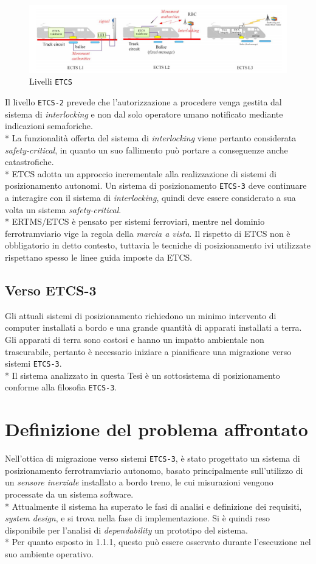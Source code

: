 \begin{figure}[h]
	\centering
	\includegraphics[width=\linewidth]{img/etcs123.png}
	\caption{Livelli \texttt{ETCS}}
	\label{fig:etcs123}
\end{figure}
Il livello \texttt{ETCS-2} prevede che l'autorizzazione a procedere venga gestita dal sistema di \emph{interlocking} e non dal solo operatore umano notificato mediante indicazioni semaforiche.\\*
La funzionalit\`a offerta del sistema di \emph{interlocking} viene pertanto considerata \emph{safety-critical}, in quanto un suo fallimento pu\`o portare a conseguenze anche catastrofiche.\cite{marocchini}\\*
ETCS adotta un approccio incrementale alla realizzazione di sistemi di posizionamento autonomi. Un sistema di posizionamento \texttt{ETCS-3} deve continuare a interagire con il sistema di \emph{interlocking}, quindi deve essere considerato a sua volta un sistema \emph{safety-critical}.\\*
ERTMS/ETCS \`e pensato per sistemi ferroviari, mentre nel dominio ferrotramviario vige la regola della \emph{marcia a vista}. Il rispetto di ETCS non \`e obbligatorio in detto contesto, tuttavia le tecniche di posizionamento ivi utilizzate rispettano spesso le linee guida imposte da ETCS. 
\subsection{Verso ETCS-3}
Gli attuali sistemi di posizionamento richiedono un minimo intervento di computer installati a bordo e una grande quantit\`a di apparati installati a terra. Gli apparati di terra sono costosi e hanno un impatto ambientale non trascurabile, pertanto \`e necessario iniziare a pianificare una migrazione verso sistemi \texttt{ETCS-3}.\cite{market}\\*
Il sistema analizzato in questa Tesi \`e un sottosistema di posizionamento conforme alla filosofia \texttt{ETCS-3}.
\section{Definizione del problema affrontato}
Nell'ottica di migrazione verso sistemi \texttt{ETCS-3}, \`e stato progettato un sistema di posizionamento ferrotramviario autonomo, basato principalmente sull'utilizzo di un \emph{sensore inerziale} installato a bordo treno, le cui misurazioni vengono processate da un sistema software. \cite{svolta}\\*
Attualmente il sistema ha superato le fasi di analisi e definizione dei requisiti, \emph{system design}, e si trova nella fase di implementazione. Si \`e quindi reso disponibile per l'analisi di \emph{dependability} un prototipo del sistema.\\*
Per quanto esposto in 1.1.1, questo pu\`o essere osservato durante l'esecuzione nel suo ambiente operativo.
